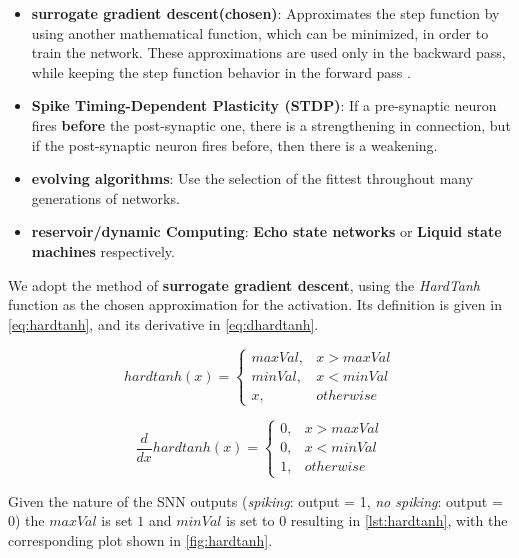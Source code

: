 		\begin{itemize}
			\item \textbf{surrogate gradient descent(chosen)}: Approximates the step function by using another mathematical function, which can be minimized, in order to train the network. These approximations are used only in the backward pass, while keeping the step function behavior in the forward pass \cite{kasabov2019time}.
			
			\item \textbf{Spike Timing-Dependent Plasticity (STDP)}: If a pre-synaptic neuron fires \textbf{before} the post-synaptic one, there is a strengthening in connection, but if the post-synaptic neuron fires before, then there is a weakening.

			\item \textbf{evolving algorithms}: Use the selection of the fittest throughout many generations of networks.
			
			\item \textbf{reservoir/dynamic Computing}: \textbf{Echo state networks} or \textbf{Liquid state machines} respectively.
		\end{itemize}
		
		\par We adopt the method of \textbf{surrogate gradient descent}, using the \textit{HardTanh} function as the chosen approximation for the activation. Its definition is given in \autoref{eq:hardtanh}, and its derivative in \autoref{eq:dhardtanh}. 
		
		\begin{equation}
			\label{eq:hardtanh}
			hardtanh(x) = 
			\begin{cases}
				maxVal, & x > maxVal\\
				minVal, & x < minVal\\
				x, & otherwise
			\end{cases}			
		\end{equation}
			
		\begin{equation}
			\label{eq:dhardtanh}
			\dfrac{d}{dx}hardtanh(x) = 
			\begin{cases}
				0, & x > maxVal\\
				0, & x < minVal\\
				1, & otherwise
			\end{cases}			
		\end{equation}
		
		\par Given the nature of the SNN outputs (\textit{spiking}: output = 1, \textit{no spiking}: output = 0) the $maxVal$ is set $1$ and $minVal$ is set to $0$ resulting in \autoref{lst:hardtanh}, with the corresponding plot shown in \autoref{fig:hardtanh}.
		
